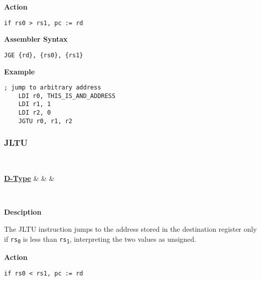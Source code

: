\vspace{3ex}

\textbf{Action}
\begin{lstlisting}[frame=single]
	if rs0 > rs1, pc := rd
\end{lstlisting}

\vspace{3ex}

\textbf{Assembler Syntax}
\begin{lstlisting}[frame=single]
	JGE {rd}, {rs0}, {rs1}
\end{lstlisting}

\vspace{3ex}

\textbf{Example}
\begin{lstlisting}[frame=single]
	; jump to arbitrary address
	LDI r0, THIS_IS_AND_ADDRESS
	LDI r1, 1
	LDI r2, 0
	JGTU r0, r1, r2
\end{lstlisting}

\subsubsection{JLTU }\label{sec:JLTU}

\vspace{3ex}

\begin{center}
	\begin{bytefield}[leftcurly=., leftcurlyspace=0pt]{32}
		 \\
		\begin{leftwordgroup}{\hyperref[sec:r-type]{\textbf{D-Type}}}
		 & 
		 &
		 &
		\end{leftwordgroup}\\
	\end{bytefield}
\end{center}

\textbf{Desciption}

The JLTU instruction jumps to the address stored in the destination register only if \texttt{rs\textsubscript{0}} is less than \texttt{rs\textsubscript{1}},
interpreting the two values as unsigned.

\vspace{3ex}

\textbf{Action}
\begin{lstlisting}[frame=single]
	if rs0 < rs1, pc := rd
\end{lstlisting}

